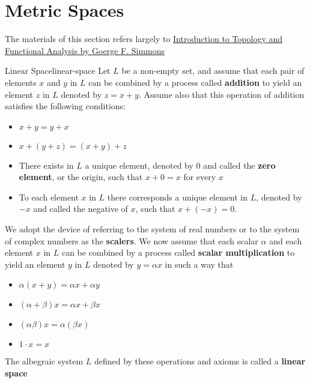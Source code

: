 \section{Metric Spaces}

The materials of this section refers largely to \href{https://trello.com/c/3EPccNTa}{Introduction to Topology and Functional Analysis by Goerge F. Simmons}

\begin{Definition}{Linear Space}{linear-space}
    Let $L$ be a non-empty set, and assume that each pair of elements $x$ and $y$ in $L$ can be combined by a process
    called \textbf{addition} to yield an element $z$ in $L$ denoted by $z = x + y$. Assume also that this operation of
    addition satisfies the following conditions:

    \begin{itemize}
        \item $x + y = y + x$
        \item $x + (y + z) = (x + y) + z$
        \item There exists in $L$ a unique element, denoted by $0$ and called the \textbf{zero element}, or the origin,
              such that $x + 0 = x$ for every $x$
        \item To each element $x$ in $L$ there corresponds a unique element in $L$, denoted by $-x$ and called the
              negative of $x$, such that $x + (-x) = 0$.
    \end{itemize}

    We adopt the device of referring to the system of real numbers or to the system of complex numbers as the
    \textbf{scalers}. We now assume that each scalar $\alpha$ and each element $x$ in $L$ can be combined by a process
    called \textbf{scalar multiplication} to yield an element $y$ in $L$ denoted by $y = \alpha x$ in such a way that

    \begin{itemize}
        \item $\alpha(x + y) = \alpha x + \alpha y$
        \item $(\alpha + \beta)x = \alpha x + \beta x$
        \item $(\alpha\beta)x = \alpha(\beta x)$
        \item $1 \cdot x = x$
    \end{itemize}

    The albegraic system $L$ defined by these operations and axioms is called a \textbf{linear space}
\end{Definition}

